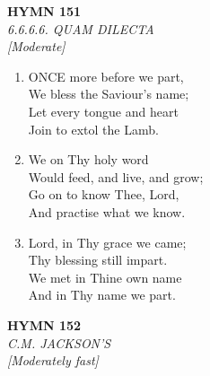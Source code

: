 \newpage
\begin{center}
    {\Large \textbf{HYMN 151}}
    \\
    \textit{6.6.6.6. QUAM DILECTA}
    \\
    \textit{\small [Moderate]}
\end{center}
\vspace{1em}

\begin{enumerate}
    \item ONCE more before we part, \\
        We bless the Saviour's name; \\
        Let every tongue and heart \\
        Join to extol the Lamb.

    \item We on Thy holy word \\
        Would feed, and live, and grow; \\
        Go on to know Thee, Lord, \\
        And practise what we know.

    \item Lord, in Thy grace we came; \\
        Thy blessing still impart. \\
        We met in Thine own name \\
        And in Thy name we part.

\end{enumerate}

\newpage
\begin{center}
    {\Large \textbf{HYMN 152}}
    \\
    \textit{C.M. JACKSON'S}
    \\
    \textit{\small [Moderately fast]}
\end{center}
\vspace{1em}

